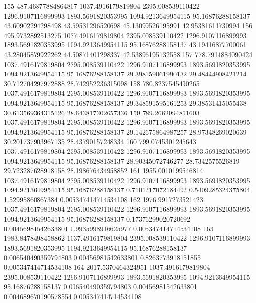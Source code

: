 {155 487.46877884864807 1037.4916179819804 2395.008539110422 1296.9107116899993 1893.5691820353995 1094.9213649954115 95.16876288158137 43.60902294298498 43.69531296520698 45.13099526195991 42.95381611730994
156 495.9732892513275 1037.4916179819804 2395.008539110422 1296.9107116899993 1893.5691820353995 1094.9213649954115 95.16876288158137 43.19416877700061 43.28045879922262 44.50871401298337 42.53896195132558
157 778.7914884090424 1037.4916179819804 2395.008539110422 1296.9107116899993 1893.5691820353995 1094.9213649954115 95.16876288158137 29.398159061990132 29.48444908421214 30.712704297972888 28.742952236315098
158 780.8237545490265 1037.4916179819804 2395.008539110422 1296.9107116899993 1893.5691820353995 1094.9213649954115 95.16876288158137 29.348591595161253 29.38531415055438 30.613569364315126 28.643817302657336
159 789.2662994861603 1037.4916179819804 2395.008539110422 1296.9107116899993 1893.5691820353995 1094.9213649954115 95.16876288158137 29.142675864987257 28.97348269020639 30.201737903967135 28.43790157248334
160 799.0745301246643 1037.4916179819804 2395.008539110422 1296.9107116899993 1893.5691820353995 1094.9213649954115 95.16876288158137 28.90345072746277 28.7342575526819 29.723287628918158 28.198676434958852
161 1955.0010199546814 1037.4916179819804 2395.008539110422 1296.9107116899993 1893.5691820353995 1094.9213649954115 95.16876288158137 0.7101217072184492 0.5409285324375804 1.52995860867384 0.005347414714534108
162 1976.9917273521423 1037.4916179819804 2395.008539110422 1296.9107116899993 1893.5691820353995 1094.9213649954115 95.16876288158137 0.17376299020720692 0.00456981542633801 0.9935998916625977 0.005347414714534108
163 1983.8478498458862 1037.4916179819804 2395.008539110422 1296.9107116899993 1893.5691820353995 1094.9213649954115 95.16876288158137 0.006540490359794803 0.00456981542633801 0.8263773918151855 0.005347414714534108
164 2017.5370464324951 1037.4916179819804 2395.008539110422 1296.9107116899993 1893.5691820353995 1094.9213649954115 95.16876288158137 0.006540490359794803 0.00456981542633801 0.004689670190578554 0.005347414714534108
}\tableexpivwaitecomsmph
